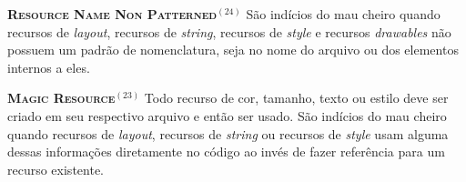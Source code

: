 

  \noindent
  \textbf{\textsc{{\small Resource Name Non Patterned}}}$^{(24)}$
      São indícios do mau cheiro quando recursos de \textit{layout}, recursos de \textit{string}, recursos de \textit{style} e recursos \textit{drawables} não possuem um padrão de nomenclatura, seja no nome do arquivo ou dos elementos internos a eles.



  \noindent
  \textbf{\textsc{{\small Magic Resource}}}$^{(23)}$
      Todo recurso de cor, tamanho, texto ou estilo deve ser criado em seu respectivo arquivo e então ser usado. São indícios do mau cheiro quando recursos de \textit{layout}, recursos de \textit{string} ou recursos de \textit{style} usam alguma dessas informações diretamente no código ao invés de fazer referência para um recurso existente.



